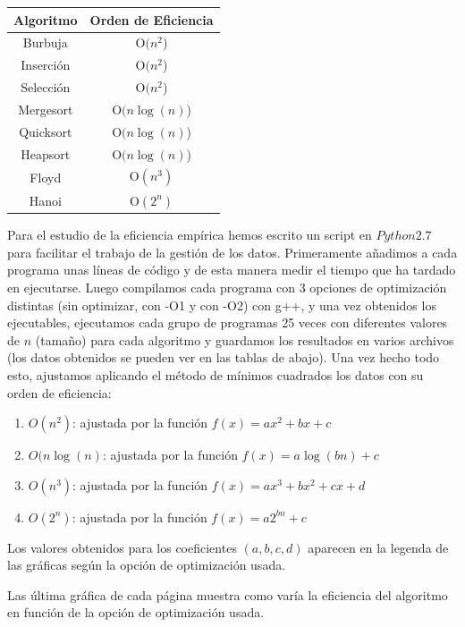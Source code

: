 \documentclass[11pt]{article}
\begin{document}
\begin{center}
\begin{tabular}{| c | c |}
\hline
Algoritmo & Orden de Eficiencia \\ \hline
Burbuja & O$(n^2$) \\ \hline
Inserción & O$(n^2$) \\ \hline 
Selección & O$(n^2$) \\ \hline 
Mergesort & O$(n\log(n)$) \\ \hline 
Quicksort & O$(n\log(n)$) \\ \hline 
Heapsort & O$(n\log(n)$) \\ \hline
Floyd & O$(n^3)$ \\ \hline 
Hanoi & O$(2^n)$ \\ \hline 
\hline
\end{tabular}
\end{center}

Para el estudio de la eficiencia empírica hemos escrito un script  en $Python 2.7$ para facilitar el trabajo de la gestión de los datos. Primeramente añadimos a cada programa unas líneas de código y de esta manera medir el tiempo que ha tardado en ejecutarse. Luego compilamos cada programa con 3 opciones de optimización distintas (sin optimizar, con -O1 y con -O2) con g++, y una vez obtenidos los ejecutables, ejecutamos cada grupo de programas 25 veces con diferentes valores de $n$ (tamaño) para cada algoritmo y guardamos los resultados en varios archivos (los datos obtenidos se pueden ver en las tablas de abajo). Una vez hecho todo esto, ajustamos aplicando el método de mínimos cuadrados los datos con su orden de eficiencia:

\begin{enumerate}
\item $O(n^2)$: ajustada por la función $f(x)=ax^2+bx+c$
\item $O(n\log(n)$: ajustada por la función $f(x)=a\log(bn)+c$
\item $O(n^3)$: ajustada por la función $f(x)=ax^3+bx^2+cx+d$
\item $O(2^n)$: ajustada por la función $f(x)=a2^{bn}+c$
\end{enumerate}


Los valores obtenidos para los coeficientes $(a,b,c,d)$ aparecen en la legenda de las gráficas según la opción de optimización usada.

Las última gráfica de cada página muestra como varía la eficiencia del algoritmo en función de la opción de optimización usada.
\end{document}
